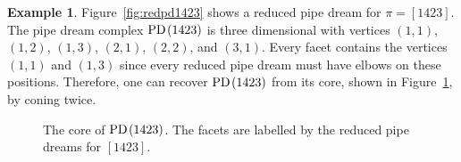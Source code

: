 \documentclass[10pt]{amsart}
\theoremstyle{definition}
\newtheorem{exem}[theo]{Example}
\numberwithin{equation}{section}
\newcommand*\petit[1]{{\scriptstyle #1}}
\newcommand*\jr{\smash{\raise2pt\hbox{\co \rlap{\rlap{\char'005} \char'007}}\raise6pt\hbox{\rlap{\vrule height6.5pt}}\raise2pt\hbox{\rlap{\hskip4pt \vrule height0.4pt depth0pt width7.7pt}}}}
\newcommand*\je{\smash{\raise2pt\hbox{\co \rlap{\rlap{\char'005}\phantom{\char'007}}}\raise6pt\hbox{\rlap{\vrule height6pt}}}}
\newcommand*\+{\smash{\lower2pt\hbox{\rlap{\vrule height14pt}}\raise2pt\hbox{\rlap{\hskip-3pt \vrule height.4pt depth0pt width14.7pt}}}}
\newcommand*\perm[2]{\hbox{\rlap{$\petit {#1}_{\scriptscriptstyle #2}$}}\phantom{\petit 1}}
\newcommand*{\MK}{\mkern 2mu}
\DeclareMathOperator{\PD}{\textit{PD}\MK}
\begin{document}
\begin{exem}
Figure~\ref{fig:redpd1423} shows a reduced pipe dream for $\pi=[1423]$.
The pipe dream complex $\PD(1423)$ is three dimensional with vertices $(1,1)$, $(1,2)$, $(1,3)$, $(2,1)$, $(2,2)$, and $(3,1)$. Every facet contains the vertices $(1,1)$ and $(1,3)$ since every reduced pipe dream must have elbows on these positions. Therefore, one can recover $\PD(1423)$ from its core, shown in Figure~\ref{fig:core1423}, by coning twice.

\begin{figure}[h]
\begingroup
\arraycolsep=5pt
\endgroup
\caption{The core of $\PD(1423)$. The facets are labelled by the reduced pipe dreams for $[1423]$.}\label{fig:core1423}
\end{figure}
\end{exem}
\end{document}
